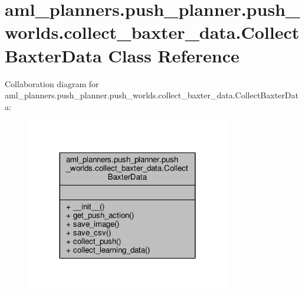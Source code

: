 \hypertarget{classaml__planners_1_1push__planner_1_1push__worlds_1_1collect__baxter__data_1_1_collect_baxter_data}{\section{aml\-\_\-planners.\-push\-\_\-planner.\-push\-\_\-worlds.\-collect\-\_\-baxter\-\_\-data.\-Collect\-Baxter\-Data Class Reference}
\label{classaml__planners_1_1push__planner_1_1push__worlds_1_1collect__baxter__data_1_1_collect_baxter_data}
}


Collaboration diagram for aml\-\_\-planners.\-push\-\_\-planner.\-push\-\_\-worlds.\-collect\-\_\-baxter\-\_\-data.\-Collect\-Baxter\-Data\-:
\nopagebreak
\begin{figure}[H]
\begin{center}
\leavevmode
\includegraphics[width=252pt]{classaml__planners_1_1push__planner_1_1push__worlds_1_1collect__baxter__data_1_1_collect_baxter_data__coll__graph}
\end{center}
\end{figure}
